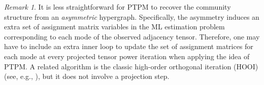 \documentclass{article}
\theoremstyle{plain}
\theoremstyle{definition}
\theoremstyle{remark}
\newtheorem{remark}[theorem]{Remark}
\begin{document}
\begin{remark}It is less straightforward for PTPM to recover the community structure from an \emph{asymmetric} hypergraph. Specifically, the asymmetry induces an extra set of assignment matrix variables in the ML estimation problem corresponding to each mode of the observed adjacency tensor. Therefore, one may have to include an extra inner loop to update the set of assignment matrices for each mode at every projected tensor power iteration when applying the idea of PTPM. A related algorithm is the classic high-order orthogonal iteration (HOOI) (see, e.g., \citet[Figure 4.4]{kolda2009tensor}), but it does not involve a projection step.
\end{remark}
\end{document}
